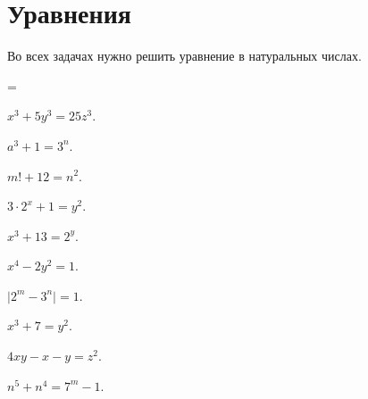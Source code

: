 

\section*{Уравнения}


Во всех задачах нужно решить уравнение в натуральных числах.

\begingroup \multicolsep=\parskip
\begin{multicols}{2}
\begin{problems}


\item
$x^3 + 5 y^3 = 25 z^3$.

\item
$a^3 + 1 = 3^n$.

\item
$m! + 12 = n^2$.

\item
$3 \cdot 2^x + 1 = y^2$.

\item
$x^3 + 13 = 2^y$.

\item
$x^4 - 2 y^2 = 1$.

\item
$\lvert 2^m - 3^n \rvert = 1$.

\item
$x^3 + 7 = y^2$.

\item
$4 x y - x - y = z^2$.

\item
$n^5 + n^4 = 7^m - 1$.

\end{problems}
\end{multicols}
\endgroup


